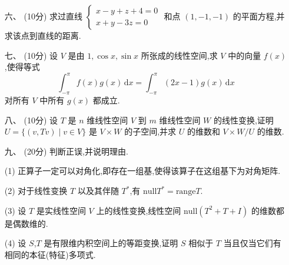 \documentclass{ctexbook}
\begin{document}
\begin{enumerate}[leftmargin=*, labelwidth=!, labelsep=0pt]
    \item[六、 (10分) ]
    求过直线 $\begin{cases}
        x - y + z + 4 = 0 \\
        x + y - 3z = 0
    \end{cases}$ 和点 $(1,-1,-1)$ 的平面方程,并求该点到直线的距离.

    \item[七、 (10分) ]
    设 $V$ 是由 $1, \cos x, \sin x$ 所张成的线性空间,求 $V$ 中的向量 $f(x)$,使得等式
    \[
    \int_{-\pi}^{\pi} f(x)g(x) \, \mathrm{d}x = \int_{-\pi}^{\pi} (2x-1)g(x) \, \mathrm{d}x
    \]
    对所有 $V$ 中所有 $g(x)$ 都成立.

    \item[八、 (10分) ]
    设 $T$ 是 $n$ 维线性空间 $V$ 到 $m$ 维线性空间 $W$ 的线性变换,证明 $U = \{(v,Tv) \mid v \in V\}$ 是 $V \times W$ 的子空间,并求 $U$ 的维数和 $V \times W/U$ 的维数.

    \item[九、 (20分) ]
    判断正误,并说明理由.
        \item[(1) ] 正算子一定可以对角化,即存在一组基,使得该算子在这组基下为对角矩阵.
        \item[(2) ] 对于线性变换 $T$ 以及其伴随 $T^*$,有 $\text{null} T^* = \text{range} T$.
        \item[(3) ] 设 $T$ 是实线性空间 $V$ 上的线性变换,线性空间 $\text{null}(T^2 + T + I)$ 的维数都是偶数维的.
        \item[(4) ] 设 $S$,$T$ 是有限维内积空间上的等距变换,证明 $S$ 相似于 $T$ 当且仅当它们有相同的本征(特征)多项式.
\end{enumerate}
\end{document}
